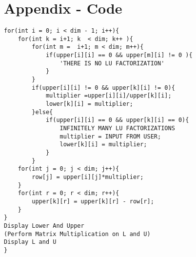 

\section*{Appendix - Code}

\begin{lstlisting}
for(int i = 0; i < dim - 1; i++){
	for(int k = i+1; k  < dim; k++ ){
		for(int m =  i+1; m < dim; m++){
			if(upper[i][i] == 0 && upper[m][i] != 0 ){
				'THERE IS NO LU FACTORIZATION'
            }
        }
		if(upper[i][i] != 0 && upper[k][i] != 0){
	        multiplier =upper[i][i]/upper[k][i];
	        lower[k][i] = multiplier;
        }else{
	        if(upper[i][i] == 0 && upper[k][i] == 0){
		        INFINITELY MANY LU FACTORIZATIONS 
		        multiplier = INPUT FROM USER;
		        lower[k][i] = multiplier;
            }
        }
    for(int j = 0; j < dim; j++){
        row[j] = upper[i][j]*multiplier;
    }
    for(int r = 0; r < dim; r++){
        upper[k][r] = upper[k][r] - row[r];
    }
}
Display Lower And Upper
(Perform Matrix Multiplication on L and U)
Display L and U
}
\end{lstlisting}
